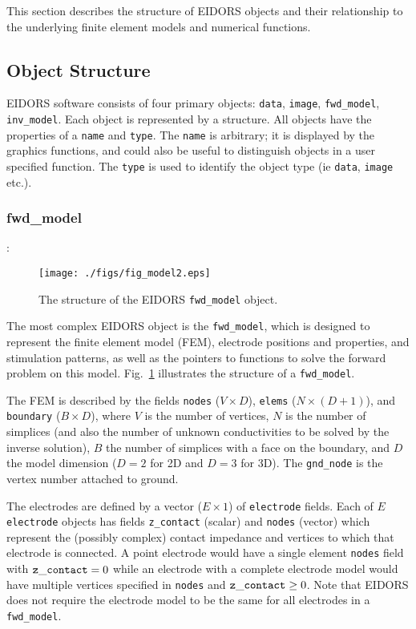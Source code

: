 \documentclass[12pt]{iopart}
\begin{document}
This section describes the structure of EIDORS objects
and their relationship to the underlying finite element
models and numerical functions.

\subsection{Object Structure}

EIDORS software consists of four primary objects:
{\tt data},
{\tt image},
{\tt fwd\_model},
{\tt inv\_model}. Each object is represented by a
structure. All objects have the properties of a
{\tt name} and {\tt type}. The {\tt name} is
arbitrary; it is displayed by the graphics functions,
and could also be useful to distinguish objects
in a user specified function.
The {\tt type} is used to identify the object type 
(ie {\tt data}, {\tt image} etc.).

\subsubsection{fwd\_model}:

%
%
\begin{figure}[th]
\begin{flushright}
\texttt{[image: ./figs/fig\_model2.eps]}
\caption{\small The structure of the EIDORS {\tt fwd\_model} object.
\label{fig:fwd_model}
 }
\end{flushright}
\end{figure}


The most complex EIDORS object is the {\tt fwd\_model},
which is designed to represent the finite element model 
(FEM), electrode
positions and properties, and stimulation patterns, as
well as the pointers to functions to solve the forward
problem on this model. Fig.~\ref{fig:fwd_model} illustrates
the structure of a {\tt fwd\_model}.

The FEM is described by the fields
{\tt nodes} ($V{\times}D$),
{\tt elems} ($N{\times}(D+1)$), and
{\tt boundary} ($B{\times}D$), where
$V$ is the number of vertices, $N$ is the number of
simplices (and also the number of unknown conductivities
to be solved by the inverse solution), $B$ the number
of simplices with a face on the boundary, and $D$ the
model dimension ($D=2$ for 2D and $D=3$ for 3D).
The {\tt gnd\_node} is the vertex number attached to ground.

The electrodes are defined by a vector ($E\times1$) of
{\tt electrode} fields. Each of $E$ {\tt electrode}
objects has fields
{\tt z\_contact} (scalar) and {\tt nodes} (vector)
 which represent the
(possibly complex) contact impedance
and vertices to which that electrode is connected.
A point electrode would have a single element
{\tt nodes} field with ${\tt z\_contact}=0$ while
an electrode with a complete electrode model
would have multiple vertices specified in {\tt nodes}
and ${\tt z\_contact}\ge0$. Note that EIDORS
does not require the electrode model to be the same
for all electrodes in a {\tt fwd\_model}.
\end{document}
